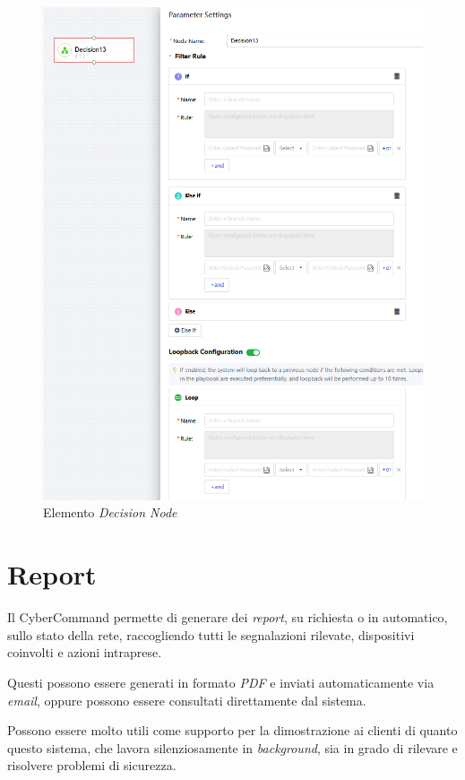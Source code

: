 \begin{figure}[!htbp]
    \centering
    \includegraphics[width=\linewidth]{images/ndr/decision-node.png}
    \caption{Elemento \emph{Decision Node}}
    \label{fig:cc-decision-node}
\end{figure}

\section{Report}

Il CyberCommand permette di generare dei \emph{report}, su richiesta o in automatico, sullo stato della rete, raccogliendo tutti le segnalazioni rilevate, dispositivi coinvolti e azioni intraprese. 

Questi possono essere generati in formato \emph{PDF} e inviati automaticamente via \emph{email}, oppure possono essere consultati direttamente dal sistema.

Possono essere molto utili come supporto per la dimostrazione ai clienti di quanto questo sistema, che lavora silenziosamente in \emph{background}, sia in grado di rilevare e risolvere problemi di sicurezza.